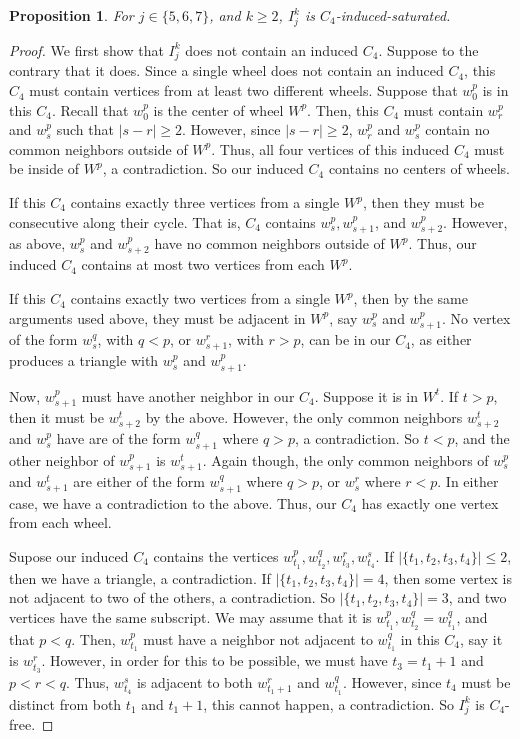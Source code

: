 \documentclass[12pt]{amsart}
\theoremstyle{plain}
\newtheorem{prop}[thm]{Proposition}
\theoremstyle{definition}
\theoremstyle{remark}
\begin{document}
\begin{prop}\label{prop:C4indsat}
For $j \in \{5,6,7\}$, and $k \geq 2$, $I_j^k$ is $C_4$-induced-saturated.
\end{prop}
\begin{proof}
We first show that $I_j^k$ does not contain an induced $C_4$.  Suppose to the contrary that it does.  Since a single wheel does not contain an induced $C_4$, this $C_4$ must contain vertices from at least two different wheels.  Suppose that $w_0^p$ is in this $C_4$.  Recall that $w_0^p$ is the center of wheel $W^p$.  Then, this $C_4$ must contain $w_r^p$ and $w_s^p$ such that $|s - r| \ge 2$.  However, since $|s - r| \ge 2$, $w_r^p$ and $w_s^p$ contain no common neighbors outside of $W^p$.  Thus, all four vertices of this induced $C_4$ must be inside of $W^p$, a contradiction.  So our induced $C_4$ contains no centers of wheels.

If this $C_4$ contains exactly three vertices from a single $W^p$, then they must be consecutive along their cycle.  That is, $C_4$ contains $w_s^p, w_{s+1}^p$, and $w_{s+2}^p$.  However, as above, $w_s^p$ and $w_{s+2}^p$ have no common neighbors outside of $W^p$.  Thus, our induced $C_4$ contains at most two vertices from each $W^p$.

If this $C_4$ contains exactly two vertices from a single $W^p$, then by the same arguments used above, they must be adjacent in $W^p$, say $w_s^p$ and $w_{s+1}^p$.  No vertex of the form $w_s^q$, with $q < p$, or $w_{s+1}^r$, with $r > p$, can be in our $C_4$, as either produces a triangle with $w_s^p$ and $w_{s+1}^p$.

Now, $w_{s+1}^p$ must have another neighbor in our $C_4$.  Suppose it is in $W^t$.  If $t > p$, then it must be $w_{s+2}^t$ by the above.  However, the only common neighbors $w_{s+2}^t$ and $w_s^p$ have are of the form $w_{s+1}^q$ where $q > p$, a contradiction.  So $t < p$, and the other neighbor of $w_{s+1}^p$ is $w_{s+1}^t$.  Again though, the only common neighbors of $w_s^p$ and $w_{s+1}^t$ are either of the form $w_{s+1}^q$ where $q > p$, or $w_s^r$ where $r < p$.  In either case, we have a contradiction to the above.  Thus, our $C_4$ has exactly one vertex from each wheel.

Supose our induced $C_4$ contains the vertices $w_{t_1}^p, w_{t_2}^q, w_{t_3}^r, w_{t_4}^s$.  If $|\{t_1,t_2,t_3,t_4\}| \le 2$, then we have a triangle, a contradiction.  If $|\{t_1,t_2,t_3,t_4\}| = 4$, then some vertex is not adjacent to two of the others, a contradiction.  So $|\{t_1,t_2,t_3,t_4\}| = 3$, and two vertices have the same subscript.  We may assume that it is $w_{t_1}^p, w_{t_2}^q = w_{t_1}^q$, and that $p < q$.  Then, $w_{t_1}^p$ must have a neighbor not adjacent to $w_{t_1}^q$ in this $C_4$, say it is $w_{t_3}^r$.  However, in order for this to be possible, we must have $t_3 = t_1 + 1$ and $p < r < q$.  Thus, $w_{t_4}^s$ is adjacent to both $w_{t_1+1}^r$ and $w_{t_1}^q$.  However, since $t_4$ must be distinct from both $t_1$ and $t_1 + 1$, this cannot happen, a contradiction.  So $I_j^k$ is $C_4$-free.


\end{proof}
\end{document}
